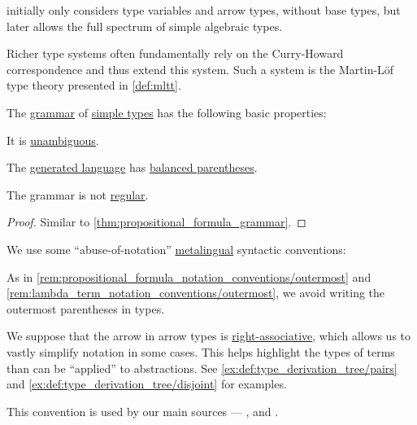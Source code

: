 \begin{concept}
\begin{thmenum}
     initially only considers type variables and arrow types, without base types, but later allows the full spectrum of simple algebraic types.

    Richer type systems often fundamentally rely on the Curry-Howard correspondence and thus extend this system. Such a system is the Martin-L\"of type theory presented in \cref{def:mltt}.
  \end{thmenum}
\end{concept}

\begin{proposition}\label{thm:simple_type_grammar}
  The \hyperref[def:formal_grammar]{grammar} of \hyperref[def:simple_type]{simple types} has the following basic properties:
  \begin{thmenum}
     It is \hyperref[def:grammar_ambiguity]{unambiguous}.

     The \hyperref[def:formal_grammar/language]{generated language} has \hyperref[def:paired_delimiters]{balanced parentheses}.

     The grammar is not \hyperref[def:chomsky_hierarchy/regular]{regular}.
  \end{thmenum}
\end{proposition}
\begin{proof}
  Similar to \cref{thm:propositional_formula_grammar}.
\end{proof}

\begin{remark}\label{rem:simple_type_parentheses}
  We use some \enquote{abuse-of-notation} \hyperref[con:metalogic]{metalingual} syntactic conventions:
  \begin{thmenum}
     As in \cref{rem:propositional_formula_notation_conventions/outermost} and \cref{rem:lambda_term_notation_conventions/outermost}, we avoid writing the outermost parentheses in types.

     We suppose that the arrow in arrow types is \hyperref[rem:binary_operation_syntax_trees/associativity]{right-associative}, which allows us to vastly simplify notation in some cases. This helps highlight the types of terms than can be \enquote{applied} to abstractions. See \cref{ex:def:type_derivation_tree/pairs} and \cref{ex:def:type_derivation_tree/disjoint} for examples.

    This convention is used by our main sources --- ,  and .
  \end{thmenum}
\end{remark}


